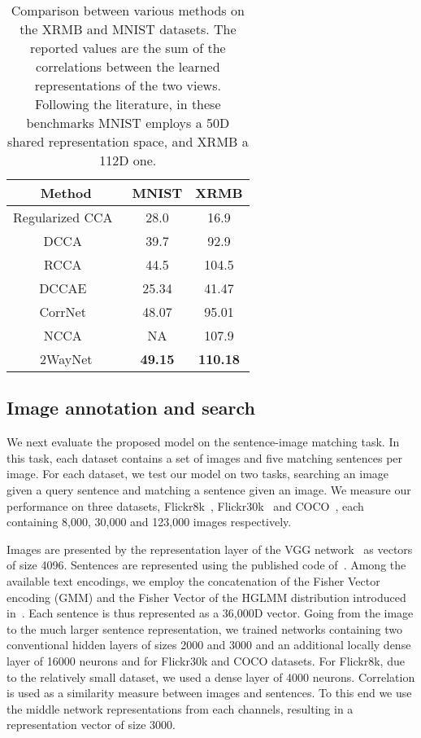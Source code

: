 \documentclass[10pt,twocolumn,letterpaper]{article}
\begin{document}
\begin{table}[h]
  \centering
  \begin{tabular}[c]{|c|c|c|}
	\hline
    Method & MNIST & XRMB \\
    \hline
    \multicolumn{1}{|c|}{Regularized CCA~\cite{regularized_cca}} & 28.0 & 16.9 \\
	\multicolumn{1}{|c|}{DCCA~\cite{deepcca}} & 39.7 & 92.9 \\
    \multicolumn{1}{|c|}{RCCA~\cite{rcca}} & 44.5 & 104.5 \\
    \multicolumn{1}{|c|}{DCCAE~\cite{dccae}} & 25.34 & 41.47 \\
    \multicolumn{1}{|c|}{CorrNet~\cite{chandar2016correlational}} & 48.07 & 95.01\\
    \multicolumn{1}{|c|}{NCCA~\cite{DBLP:journals/corr/MichaeliWL15}} & NA & 107.9\\
    \multicolumn{1}{|c|}{2WayNet} & \textbf{49.15} & \textbf{110.18} \\
    \hline
	\end{tabular}\caption{Comparison between various methods on the XRMB and MNIST datasets. The reported values are the sum of the correlations between the learned representations of the two views. Following the literature, in these benchmarks MNIST employs a 50D shared representation space, and XRMB a 112D one.}
    \label{tab:exp}\end{table}

\subsection{Image annotation and search} 
We next evaluate the proposed model on the sentence-image matching task. In this task, each dataset contains a set of images and five matching sentences per image. For each dataset, we test our model on two tasks, searching an image given a query sentence and matching a sentence given an image. We measure our performance on three datasets, Flickr8k~\cite{flickr8k}, Flickr30k~\cite{flickr30k} and COCO~\cite{coco}, each containing 8,000, 30,000 and 123,000 images respectively. 

Images are presented by the representation layer of the VGG network~\cite{vgg} as vectors of size 4096. Sentences are represented using the published code of~\cite{Klein_2015_CVPR}. Among the available text encodings, we employ the concatenation of the Fisher Vector encoding (GMM) and the Fisher Vector of the HGLMM distribution introduced in~\cite{Klein_2015_CVPR}. Each sentence is thus represented as a 36,000D vector. Going from the image to the much larger sentence representation, we trained networks containing two conventional hidden layers of sizes 2000 and 3000 and an additional locally dense layer of 16000 neurons and  for Flickr30k and COCO datasets. For Flickr8k, due to the relatively small dataset, we used a dense layer of 4000 neurons. 
Correlation is used as a similarity measure between images and sentences. To this end we use the middle network representations from each channels, resulting in a representation vector of size 3000.
\end{document}
